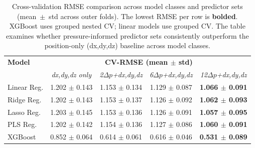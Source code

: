         \begin{table}[htbp]
        \centering
        \captionsetup{font=footnotesize}
        \caption{Cross-validation RMSE comparison across model classes and predictor sets (mean~$\pm$~std across outer folds). The lowest RMSE per row is \textbf{bolded}. XGBoost uses grouped nested CV; linear models use grouped CV. The table examines whether pressure-informed predictor sets consistently outperform the position-only (dx,dy,dz) baseline across model classes.}
        \footnotesize
        \setlength{\tabcolsep}{5pt}
        \renewcommand{\arraystretch}{1.2}
        \begin{tabular}{l|cccc}
        \hline\hline
        \textbf{Model} & \multicolumn{4}{c}{\textbf{CV-RMSE (mean $\pm$ std)}} \\
         & \textit{dx,dy,dz only} & \textit{2$\Delta p$+dx,dy,dz} & \textit{6$\Delta p$+dx,dy,dz} & \textit{12$\Delta p$+dx,dy,dz} \\
        \hline
        Linear Reg. & 1.202 $\pm$ 0.143 & 1.153 $\pm$ 0.134 & 1.129 $\pm$ 0.087 & \textbf{1.066 $\pm$ 0.091} \\
        Ridge Reg. & 1.202 $\pm$ 0.143 & 1.153 $\pm$ 0.137 & 1.126 $\pm$ 0.092 & \textbf{1.062 $\pm$ 0.093} \\
        Lasso Reg. & 1.203 $\pm$ 0.145 & 1.153 $\pm$ 0.136 & 1.126 $\pm$ 0.091 & \textbf{1.057 $\pm$ 0.095} \\
        PLS Reg. & 1.202 $\pm$ 0.142 & 1.154 $\pm$ 0.136 & 1.127 $\pm$ 0.086 & \textbf{1.060 $\pm$ 0.091} \\
        XGBoost & 0.852 $\pm$ 0.064 & 0.614 $\pm$ 0.061 & 0.616 $\pm$ 0.046 & \textbf{0.531 $\pm$ 0.089} \\
        \hline
        \end{tabular}
        \label{tab:model_comparison}
        \end{table}
